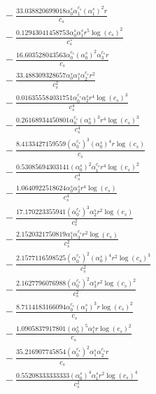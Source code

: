 \documentclass[10pt]{article}
\begin{document}
\begin{align*}
&{}  - \frac{33.038820699018 \alpha_{0}^s \alpha_{1}^{c_s} \left(\alpha_{1}^s\right)^{2} r}{c_{s}} \\
&{}  - \frac{0.12943041458753 \alpha_{0}^s \alpha_{1}^s r^{5} \log{\left(c_{s} \right)}^{2}}{c_{s}^{5}} \\
&{}  - \frac{16.603528043563 \alpha_{0}^{c_s} \left(\alpha_{0}^s\right)^{2} \alpha_{3}^{c_s} r}{c_{s}} \\
&{}  - \frac{33.488309328657 \alpha_{0}^s \alpha_{1}^s \alpha_{2}^{c_s} r^{2}}{c_{s}^{2}} \\
&{}  - \frac{0.016355584031751 \alpha_{0}^{c_s} \alpha_{2}^s r^{4} \log{\left(c_{s} \right)}^{3}}{c_{s}^{4}} \\
&{}  - \frac{0.26168934450801 \alpha_{0}^{c_s} \left(\alpha_{0}^s\right)^{3} r^{4} \log{\left(c_{s} \right)}^{3}}{c_{s}^{4}} \\
&{}  - \frac{8.4133427159559 \left(\alpha_{0}^{c_s}\right)^{3} \left(\alpha_{0}^s\right)^{4} r \log{\left(c_{s} \right)}}{c_{s}} \\
&{}  - \frac{0.53085694303141 \left(\alpha_{0}^s\right)^{2} \alpha_{1}^{c_s} r^{4} \log{\left(c_{s} \right)}^{2}}{c_{s}^{4}} \\
&{}  - \frac{1.0640922518624 \alpha_{0}^s \alpha_{2}^s r^{4} \log{\left(c_{s} \right)}}{c_{s}^{4}} \\
&{}  - \frac{17.170223355941 \left(\alpha_{0}^{c_s}\right)^{3} \alpha_{2}^s r^{2} \log{\left(c_{s} \right)}}{c_{s}^{2}} \\
&{}  - \frac{2.1520321750819 \alpha_{1}^s \alpha_{3}^{c_s} r^{2} \log{\left(c_{s} \right)}}{c_{s}^{2}} \\
&{}  - \frac{2.1577116598525 \left(\alpha_{0}^{c_s}\right)^{2} \left(\alpha_{0}^s\right)^{4} r^{2} \log{\left(c_{s} \right)}^{3}}{c_{s}^{2}} \\
&{}  - \frac{2.1627796076988 \left(\alpha_{0}^{c_s}\right)^{2} \alpha_{3}^s r^{2} \log{\left(c_{s} \right)}^{2}}{c_{s}^{2}} \\
&{}  - \frac{8.7114183166094 \alpha_{0}^{c_s} \left(\alpha_{1}^s\right)^{3} r \log{\left(c_{s} \right)}^{2}}{c_{s}} \\
&{}  - \frac{1.0905837917801 \left(\alpha_{0}^s\right)^{5} \alpha_{1}^s r \log{\left(c_{s} \right)}^{2}}{c_{s}} \\
&{}  - \frac{35.216907745854 \left(\alpha_{0}^{c_s}\right)^{2} \alpha_{1}^s \alpha_{2}^{c_s} r}{c_{s}} \\
&{}  - \frac{0.55208333333333 \left(\alpha_{0}^s\right)^{4} \alpha_{1}^s r^{2} \log{\left(c_{s} \right)}^{4}}{c_{s}^{2}} \\

\end{align*}
\end{document}
